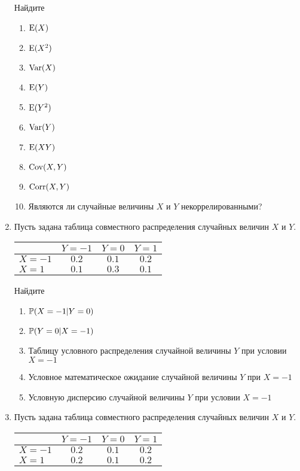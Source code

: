 \begin{enumerate}
Найдите
\begin{enumerate}
\item $\E(X)$
\item $\E(X^{2})$
\item $\Var(X)$
\item $\E(Y)$
\item $\E(Y^{2})$
\item $\Var(Y)$
\item $\E(XY)$
\item $\Cov(X,Y)$
\item $\Corr(X,Y)$
\item Являются ли случайные величины $X$ и $Y$ некоррелированными?
\end{enumerate}

\item
Пусть задана таблица совместного распределения случайных величин $X$ и $Y$.

\begin{center}
\begin{tabular}{lccc}
\toprule
                       & $Y=-1$  & $Y=0$   & $Y=1$   \\ \midrule
$X=-1$                 & $0.2$ & $0.1$ & $0.2$ \\
 $X=1$                 & $0.1$ & $0.3$ & $0.1$ \\ \bottomrule
\end{tabular}
\end{center}

Найдите
\begin{enumerate}
\item $\P(X = -1 | Y = 0)$
\item $\P(Y = 0 | X = -1)$
\item Таблицу условного распределения случайной величины $Y$ при условии $X = -1$
\item Условное математическое ожидание случайной величины $Y$ при $X = -1$
\item Условную дисперсию случайной величины $Y$ при условии $X = -1$
\end{enumerate}

\item Пусть задана таблица совместного распределения случайных величин $X$ и $Y$.

\begin{center}
\begin{tabular}{lccc}
\toprule
                   & $Y=-1$  & $Y=0$   & $Y=1$   \\ \midrule
$X=-1$                 & $0.2$ & $0.1$ & $0.2$ \\
 $X=1$                 & $0.2$ & $0.1$ & $0.2$ \\ \bottomrule
\end{tabular}
\end{center}


\end{enumerate}
